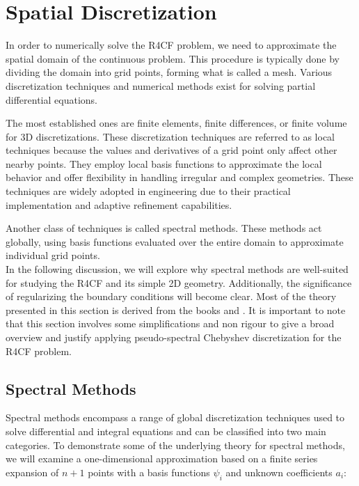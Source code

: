 
\section{Spatial Discretization} \label{sec:spectral}

In order to numerically solve the R4CF problem, we need to approximate the
spatial domain of the continuous problem. This procedure is typically done by
dividing the domain into grid points, forming what is called a mesh. Various
discretization techniques and numerical methods exist for solving partial
differential equations.

The most established ones are finite elements, finite differences, or finite
volume for 3D discretizations. These discretization techniques are referred to
as local techniques because the values and derivatives of a grid point only
affect other nearby points. They employ local basis functions to approximate
the local behavior and offer flexibility in handling irregular and complex
geometries. These techniques are widely adopted in engineering due to their
practical implementation and adaptive refinement capabilities.

Another class of techniques is called spectral methods. These methods act
globally, using basis functions evaluated over the entire domain to approximate
individual grid points. \\

In the following discussion, we will explore why spectral methods are
well-suited for studying the R4CF and its simple 2D geometry. Additionally, the
significance of regularizing the boundary conditions will become clear. Most of
the theory presented in this section is derived from the books \citet{boyd2001}
and \citet{canuto2006}.  It is important to note that this section involves
some simplifications and non rigour to give a broad overview and justify
applying pseudo-spectral Chebyshev discretization for the R4CF problem.

\subsection{Spectral Methods}

Spectral methods encompass a range of global discretization techniques used to
solve differential and integral equations and can be classified into two main
categories. To demonstrate some of the underlying theory for spectral methods,
we will examine a one-dimensional approximation based on a finite series
expansion of $n+1$ points with a basis functions $\psi_i$ and unknown
coefficients $a_i$:


